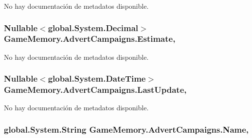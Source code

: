 No hay documentación de metadatos disponible. 

\hypertarget{class_game_memory_1_1_advert_campaigns_a7522ba2501af95ad0ca28b9ca1e3230a}{
\subsubsection[{Estimate}]{\setlength{\rightskip}{0pt plus 5cm}Nullable$<$global.\-System.\-Decimal$>$ Game\-Memory.\-Advert\-Campaigns.\-Estimate\hspace{0.3cm}{\ttfamily [get]}, {\ttfamily [set]}}}\label{class_game_memory_1_1_advert_campaigns_a7522ba2501af95ad0ca28b9ca1e3230a}


No hay documentación de metadatos disponible. 

\hypertarget{class_game_memory_1_1_advert_campaigns_ac344d89b4ad8fb19599f44c9fa915241}{
\subsubsection[{Last\-Update}]{\setlength{\rightskip}{0pt plus 5cm}Nullable$<$global.\-System.\-Date\-Time$>$ Game\-Memory.\-Advert\-Campaigns.\-Last\-Update\hspace{0.3cm}{\ttfamily [get]}, {\ttfamily [set]}}}\label{class_game_memory_1_1_advert_campaigns_ac344d89b4ad8fb19599f44c9fa915241}


No hay documentación de metadatos disponible. 

\hypertarget{class_game_memory_1_1_advert_campaigns_a21f383f075ec3feed11b31fae8b68776}{
\subsubsection[{Name}]{\setlength{\rightskip}{0pt plus 5cm}global.\-System.\-String Game\-Memory.\-Advert\-Campaigns.\-Name\hspace{0.3cm}{\ttfamily [get]}, {\ttfamily [set]}}}\label{class_game_memory_1_1_advert_campaigns_a21f383f075ec3feed11b31fae8b68776}


